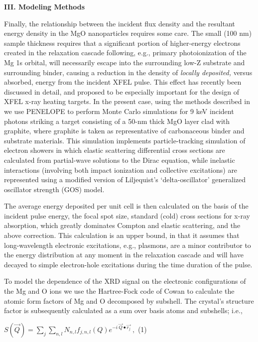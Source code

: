 \textbf{III. Modeling Methods}

Finally, the relationship between the incident flux density and the
resultant energy density in the MgO nanoparticles requires some care.
The small (100 nm) sample thickness requires that a significant portion
of higher-energy electrons created in the relaxation cascade following,
e.g., primary photoionization of the Mg 1s orbital, will necessarily
escape into the surrounding low-Z substrate and surrounding binder,
causing a reduction in the density of \emph{locally deposited,} versus
absorbed, energy from the incident XFEL pulse. This effect has recently
been discussed in detail, and proposed to be especially important for
the design of XFEL x-ray heating targets. \cite{hoidn2017nonlocal} In the present case,
using the methods described in \cite{hoidn2017nonlocal} we use PENELOPE to perform Monte
Carlo simulations for 9 keV incident photons striking a target
consisting of a 50-nm thick MgO layer clad with graphite, where graphite
is taken as representative of carbonaceous binder and substrate
materials. This simulation implements particle-tracking simulation of
electron showers in which elastic scattering differential cross sections
are calculated from partial-wave solutions to the Dirac equation, while
inelastic interactions (involving both impact ionization and collective
excitations) are represented using a modified version of Liljequist's
`delta-oscillator' generalized oscillator strength (GOS) model. \cite{hoidn2017nonlocal}

The average energy deposited per unit cell is then calculated on the
basis of the incident pulse energy, the focal spot size, standard (cold)
cross sections for x-ray absorption, which greatly dominates Compton and
elastic scattering, and the above correction. This calculation is an
upper bound, in that it assumes that long-wavelength electronic
excitations, e.g., plasmons, are a minor contributor to the energy
distribution at any moment in the relaxation cascade and will have
decayed to simple electron-hole excitations during the time duration of
the pulse.

To model the dependence of the XRD signal on the electronic
configurations of the Mg and O ions we use the Hartree-Fock code of
Cowan \cite{abdallah1988theoretical} to calculate the atomic form factors of Mg and O
decomposed by subshell. The crystal's structure factor is subsequently
calculated as a sum over basis atoms and subshells; i.e.,

\(S\left( \overrightarrow{Q} \right) = \sum_{j}^{}{\sum_{n,l}N_{n,l}f_{j,n,l}\left( Q \right)e^{- i\ \overrightarrow{Q} \bullet \overrightarrow{r_{j}}}\ },\)
(1)

